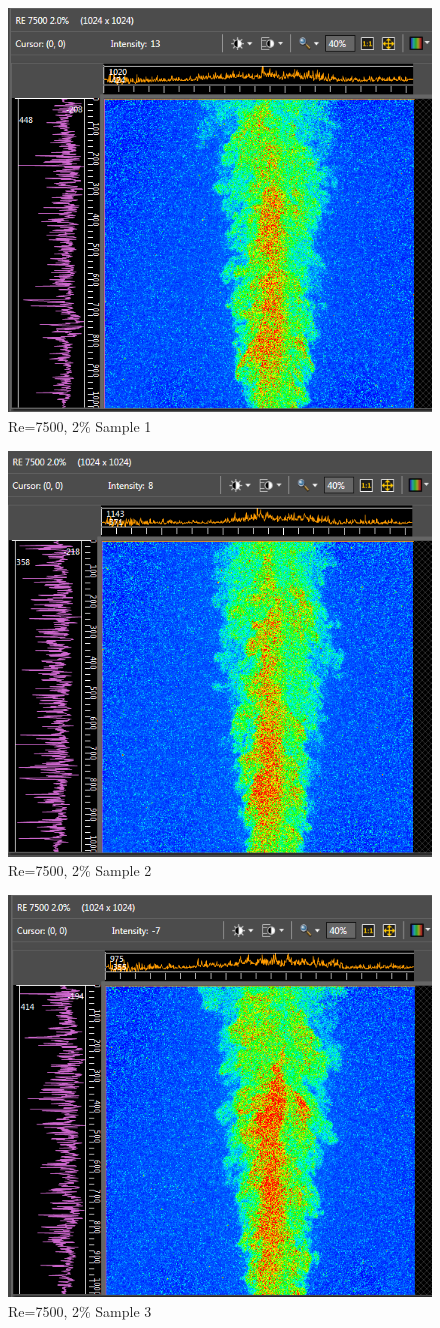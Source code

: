 \documentclass[preview,12pt]{article}
\begin{document}
\begin{figure}[h]
    \centering
    \includegraphics[width=0.55\linewidth]{RE-7500-20-1st.PNG}
    \caption{{\footnotesize Re=7500, 2\% Sample 1}}
\end{figure}
\begin{figure}[h]
    \centering
    \includegraphics[width=0.55\linewidth]{RE-7500-20-2nd.PNG}
    \caption{{\footnotesize Re=7500, 2\% Sample 2}}
\end{figure}
\begin{figure}[h]
    \centering
    \includegraphics[width=0.55\linewidth]{RE-7500-20-3rd.PNG}
    \caption{{\footnotesize Re=7500, 2\% Sample 3}}
\end{figure}
\end{document}
